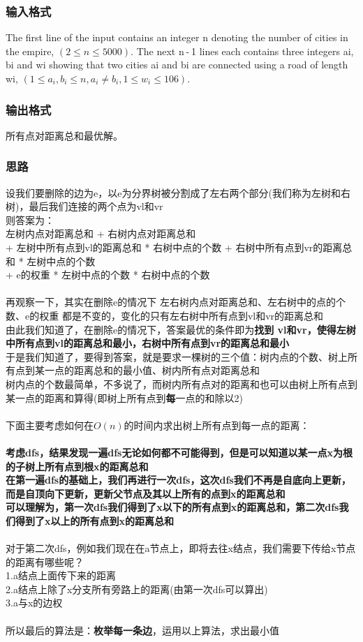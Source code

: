     \subsubsection{输入格式}
        The first line of the input contains an integer n denoting the number of cities in the empire, $(2 \leq n \leq 5000)$. The next n - 1 lines each contains three integers ai, bi and wi showing that two cities ai and bi are connected using a road of length wi, $(1 \leq a_i, b_i \leq n, a_i \neq b_i, 1 \leq w_i \leq 106)$.
    \subsubsection{输出格式}
        所有点对距离总和最优解。
    \subsubsection{思路}
        设我们要删除的边为e，以e为分界树被分割成了左右两个部分(我们称为左树和右树)，最后我们连接的两个点为vl和vr\\
        则答案为：\\
        左树内点对距离总和 + 右树内点对距离总和\\
        + 左树中所有点到vl的距离总和 * 右树中点的个数 + 右树中所有点到vr的距离总和 * 左树中点的个数\\
        + e的权重 * 左树中点的个数 * 右树中点的个数\\\\
        再观察一下，其实在删除e的情况下 左右树内点对距离总和、左右树中的点的个数、e的权重 都是不变的，变化的只有左右树中所有点到vl和vr的距离总和\\
        由此我们知道了，在删除e的情况下，答案最优的条件即为\textbf{找到 vl和vr，使得左树中所有点到vl的距离总和最小，右树中所有点到vr的距离总和最小}\\
        于是我们知道了，要得到答案，就是要求一棵树的三个值：树内点的个数、树上所有点到某一点的距离总和的最小值、树内所有点对距离总和\\
        树内点的个数最简单，不多说了，而树内所有点对的距离和也可以由树上所有点到某一点的距离和算得(即树上所有点到\textbf{每}一点的和除以2)\\\\
        下面主要考虑如何在$O(n)$的时间内求出树上所有点到每一点的距离：\\\\
        \textbf{考虑dfs，结果发现一遍dfs无论如何都不可能得到，但是可以知道以某一点x为根的子树上所有点到根x的距离总和\\
        在第一遍dfs的基础上，我们再进行一次dfs，这次dfs我们不再是自底向上更新，而是自顶向下更新，更新父节点及其以上所有的点到x的距离总和\\
        可以理解为，第一次dfs我们得到了x以下的所有点到x的距离总和，第二次dfs我们得到了x以上的所有点到x的距离总和}\\\\
        对于第二次dfs，例如我们现在在a节点上，即将去往x结点，我们需要下传给x节点的距离有哪些呢？\\
        1.a结点上面传下来的距离\\
        2.a结点上除了x分支所有旁路上的距离(由第一次dfs可以算出)\\
        3.a与x的边权\\\\
        所以最后的算法是：\textbf{枚举每一条边}，运用以上算法，求出最小值